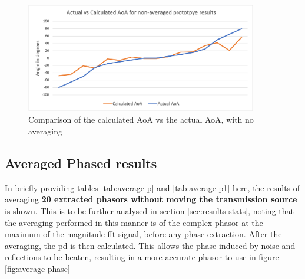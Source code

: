 \documentclass[class=report,11pt,crop=false]{standalone}
\begin{document}
\begin{figure}[h]
    \centering
    \includegraphics[width=0.9\textwidth]{Images/plots/AoA-prototpye-nonaveraged.png}
    \caption{Comparison of the calculated AoA vs the actual AoA, with no averaging}
    \label{fig:phase-angles}
\end{figure}

\subsection{Averaged Phased results}
In briefly providing tables \ref{tab:average-p} and \ref{tab:average-p1} here, the results of averaging \textbf{20 extracted phasors without moving the transmission source} is shown. This is to be further analysed in section \ref{sec:results-stats}, noting that the averaging performed in this manner is of the complex phasor at the maximum of the magnitude \gls{fft} signal, before any phase extraction. After the averaging, the \gls{pd} is then calculated. This allows the phase induced by noise and reflections to be beaten, resulting in a more accurate phasor to use in figure \ref{fig:average-phase} 
\end{document}
